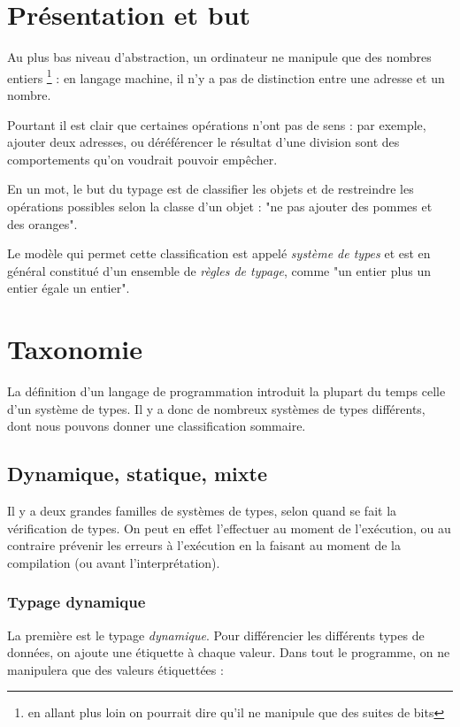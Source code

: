 \section{Présentation et but}

Au plus bas niveau d'abstraction, un ordinateur ne manipule que des nombres
entiers \footnote{en allant plus loin on pourrait dire qu'il ne manipule que des
suites de bits} : en langage machine, il n'y a pas de distinction entre une
adresse et un nombre.

Pourtant il est clair que certaines opérations n'ont pas de sens : par exemple,
ajouter deux adresses, ou déréférencer le résultat d'une division sont des
comportements qu'on voudrait pouvoir empêcher.

En un mot, le but du typage est de classifier les objets et de restreindre les
opérations possibles selon la classe d'un objet : "ne pas ajouter des pommes et
des oranges".

Le modèle qui permet cette classification est appelé \emph{système de types} et
est en général constitué d'un ensemble de \emph{règles de typage}, comme "un
entier plus un entier égale un entier".

\section{Taxonomie}

La définition d'un langage de programmation introduit la plupart du temps celle
d'un système de types. Il y a donc de nombreux systèmes de types différents,
dont nous pouvons donner une classification sommaire.

\subsection{Dynamique, statique, mixte}

Il y a deux grandes familles de systèmes de types, selon quand se fait la
vérification de types. On peut en effet l'effectuer au moment de l'exécution, ou
au contraire prévenir les erreurs à l'exécution en la faisant au moment de la
compilation (ou avant l'interprétation).

\subsubsection{Typage dynamique}

La première est le typage \emph{dynamique}. Pour différencier les différents
types de données, on ajoute une étiquette à chaque valeur. Dans tout le
programme, on ne manipulera que des valeurs étiquettées :

